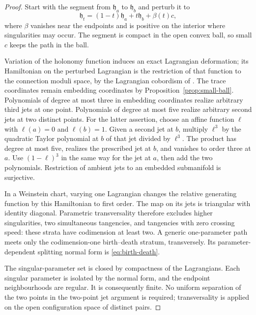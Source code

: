 \documentclass[11pt]{amsart}
\theoremstyle{definition}
\theoremstyle{remark}
\theoremstyle{plain}
\numberwithin{equation}{section}
\begin{document}
\begin{proof}
Start with the segment from $\mathfrak h_a$ to $\mathfrak h_b$
and perturb it to
\[
 \mathfrak h_t=(1-t)\mathfrak h_a+t\mathfrak h_b+\beta(t)c,
\]
where $\beta$ vanishes near the endpoints
and is positive on the interior where
singularities may occur. The segment is
compact in the open convex ball, so small
$c$ keeps the path in the ball.

Variation of the holonomy function induces
an exact Lagrangian deformation; its
Hamiltonian on the perturbed Lagrangian is
the restriction of that function to the
connection moduli space, by the Lagrangian
cobordism of \cite[Proposition~2.18]{DFL}. The trace
coordinates remain embedding coordinates
by Proposition~\ref{prop:small-ball}.
Polynomials of degree at most three in
embedding coordinates realize arbitrary
third jets at one point. Polynomials of
degree at most five realize arbitrary
second jets at two distinct points. For
the latter assertion, choose an affine function $\ell$ with
$\ell(a)=0$ and $\ell(b)=1$. Given a second jet at $b$, multiply
$\ell^3$ by the quadratic Taylor polynomial at $b$ of that jet
divided by $\ell^3$. The product has degree at most five, realizes
the prescribed jet at $b$, and vanishes to order three at $a$.
Use $(1-\ell)^3$ in the same way for the jet at $a$, then add
the two polynomials. Restriction of ambient jets
to an embedded submanifold is surjective.

In a Weinstein chart, varying one
Lagrangian changes the relative generating
function by this Hamiltonian to first
order. The map on its jets is triangular
with identity diagonal. Parametric
transversality therefore excludes higher
singularities, two simultaneous tangencies,
and tangencies with zero crossing speed:
these strata have codimension at least two.
A generic one-parameter path meets only
the codimension-one birth--death stratum,
transversely. Its parameter-dependent
splitting normal form is
\eqref{eq:birth-death}.

The singular-parameter set is closed by
compactness of the Lagrangians. Each
singular parameter is isolated by the
normal form, and the endpoint neighbourhoods
are regular. It is consequently finite.
No uniform separation of the two points
in the two-point jet argument is required;
transversality is applied on the open
configuration space of distinct pairs.
\end{proof}
\end{document}
